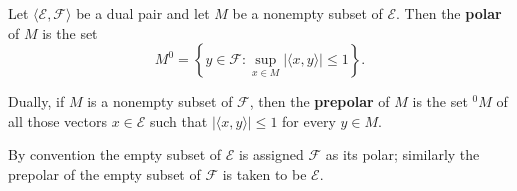 Let $\langle \mathcal{E}, \mathcal{F} \rangle$ be a dual pair and let $M$ be a nonempty subset of $\mathcal{E}$. Then the \textbf{polar} of $M$ is the set
$$M^0 = \left\{y \in \mathcal{F} : \sup_{x \in M} |\langle x, y \rangle| \leq 1\right\}.$$

Dually, if $M$ is a nonempty subset of $\mathcal{F}$, then the \textbf{prepolar} of $M$ is the set $^0 M$ of all those vectors $x \in \mathcal{E}$ such that $|\langle x, y \rangle| \leq 1$ for every $y \in M$.

By convention the empty subset of $\mathcal{E}$ is assigned $\mathcal{F}$ as its polar; similarly the prepolar of the empty subset of $\mathcal{F}$ is taken to be $\mathcal{E}$.
